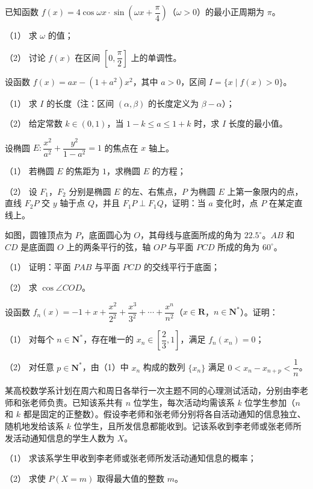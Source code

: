 \begin{question}
已知函数 $f(x)=4\cos\omega x\cdot\sin\left(\omega x+\dfrac{\pi}{4}\right)$（$\omega>0$）的最小正周期为 $\pi$。

（1） 求 $\omega$ 的值；

（2） 讨论 $f(x)$ 在区间 $\left[0,\dfrac{\pi}{2}\right]$ 上的单调性。

\end{question}
\begin{question}
设函数 $f(x)=ax-(1+a^2)x^2$，其中 $a>0$，区间 $I=\{x\mid f(x)>0\}$。

（1） 求 $I$ 的长度（注：区间 $(\alpha,\beta)$ 的长度定义为 $\beta-\alpha$）；

（2） 给定常数 $k\in(0,1)$，当 $1-k\leqslant a\leqslant1+k$ 时，求 $I$ 长度的最小值。

\end{question}
\begin{question}
设椭圆 $E:\dfrac{x^2}{a^2}+\dfrac{y^2}{1-a^2}=1$ 的焦点在 $x$ 轴上。

（1） 若椭圆 $E$ 的焦距为 $1$，求椭圆 $E$ 的方程；

（2） 设 $F_1$，$F_2$ 分别是椭圆 $E$ 的左、右焦点，$P$ 为椭圆 $E$ 上第一象限内的点，直线 $F_2P$ 交 $y$ 轴于点 $Q$，并且 $F_1P\perp F_1Q$，证明：当 $a$ 变化时，点 $P$ 在某定直线上。

\Needspace{0.4\textheight}
\end{question}
\begin{question}
如图，圆锥顶点为 $P$，底面圆心为 $O$，其母线与底面所成的角为 $22.5^\circ$。$AB$ 和 $CD$ 是底面圆 $O$ 上的两条平行的弦，轴 $OP$ 与平面 $PCD$ 所成的角为 $60^\circ$。

（1） 证明：平面 $PAB$ 与平面 $PCD$ 的交线平行于底面；

（2） 求 $\cos\angle COD$。
\nopagebreak[4]
\begin{center}\end{center}
\nopagebreak[4]
\end{question}
\begin{question}
设函数 $f_n(x)=-1+x+\dfrac{x^2}{2^2}+\dfrac{x^3}{3^2}+\cdots+\dfrac{x^n}{n^2}$（$x\in\mathbf R$，$n\in\mathbf N^*$）。证明：

（1） 对每个 $n\in\mathbf N^*$，存在唯一的 $x_n\in\left[\dfrac23,1\right]$，满足 $f_n(x_n)=0$；

（2） 对任意 $p\in\mathbf N^*$，由（1）中 $x_n$ 构成的数列 $\{x_n\}$ 满足 $0<x_n-x_{n+p}<\dfrac1n$。

\end{question}
\begin{question}
某高校数学系计划在周六和周日各举行一次主题不同的心理测试活动，分别由李老师和张老师负责。已知该系共有 $n$ 位学生，每次活动均需该系 $k$ 位学生参加（$n$ 和 $k$ 都是固定的正整数）。假设李老师和张老师分别将各自活动通知的信息独立、随机地发给该系 $k$ 位学生，且所发信息都能收到。记该系收到李老师或张老师所发活动通知信息的学生人数为 $X$。

（1） 求该系学生甲收到李老师或张老师所发活动通知信息的概率；

（2） 求使 $P(X=m)$ 取得最大值的整数 $m$。

\end{question}